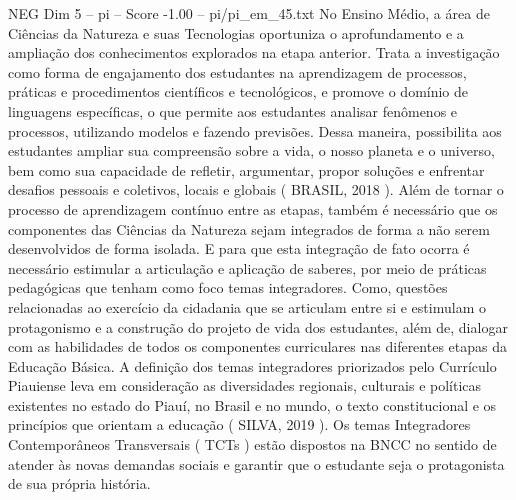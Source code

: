\begin{textsample}{NEG Dim 5 – pi – Score -1.00 – pi/pi\_em\_45.txt}
No Ensino Médio, a área de Ciências da Natureza e suas Tecnologias oportuniza o aprofundamento e a ampliação dos conhecimentos explorados na etapa anterior.
Trata a investigação como forma de engajamento dos estudantes na aprendizagem de processos, práticas e procedimentos científicos e tecnológicos, e promove o domínio de linguagens específicas, o que permite aos estudantes analisar fenômenos e processos, utilizando modelos e fazendo previsões.
Dessa maneira, possibilita aos estudantes ampliar sua compreensão sobre a vida, o nosso planeta e o universo, bem como sua capacidade de refletir, argumentar, propor soluções e enfrentar desafios pessoais e coletivos, locais e globais ( BRASIL, 2018 ).
Além de tornar o processo de aprendizagem contínuo entre as etapas, também é necessário que os componentes das Ciências da Natureza sejam integrados de forma a não serem desenvolvidos de forma isolada.
E para que esta integração de fato ocorra é necessário estimular a articulação e aplicação de saberes, por meio de práticas pedagógicas que tenham como foco temas integradores.
Como, questões relacionadas ao exercício da cidadania que se articulam entre si e estimulam o protagonismo e a construção do projeto de vida dos estudantes, além de, dialogar com as habilidades de todos os componentes curriculares nas diferentes etapas da Educação Básica.
A definição dos temas integradores priorizados pelo Currículo Piauiense leva em consideração as diversidades regionais, culturais e políticas existentes no estado do Piauí, no Brasil e no mundo, o texto constitucional e os princípios que orientam a educação ( SILVA, 2019 ).
Os temas Integradores Contemporâneos Transversais ( TCTs ) estão dispostos na BNCC no sentido de atender às novas demandas sociais e garantir que o estudante seja o protagonista de sua própria história.

\end{textsample}
